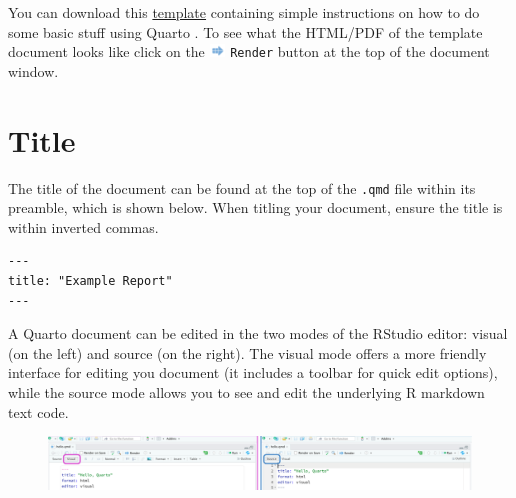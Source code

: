 \documentclass[
  letterpaper,
  DIV=11,
  numbers=noendperiod]{scrartcl}
\begin{document}
\begin{tcolorbox}[enhanced jigsaw, colback=white, toprule=.15mm, arc=.35mm, colbacktitle=quarto-callout-note-color!10!white, titlerule=0mm, colframe=quarto-callout-note-color-frame, title=\textcolor{quarto-callout-note-color}{\faInfo}\hspace{0.5em}{Note}, bottomtitle=1mm, toptitle=1mm, coltitle=black, rightrule=.15mm, opacityback=0, bottomrule=.15mm, breakable, leftrule=.75mm, left=2mm, opacitybacktitle=0.6]

You can download this
\href{https://quarto.org/docs/get-started/hello/rstudio/_hello.qmd}{template}
containing simple instructions on how to do some basic stuff using
Quarto . To see what the HTML/PDF of the template document looks like
click on the
\includegraphics[width=0.16667in,height=0.13542in]{images/rstudio-render-button.png}
\texttt{Render} button at the top of the document window.

\end{tcolorbox}

\hypertarget{title}{%
\section{Title}\label{title}}

The title of the document can be found at the top of the \texttt{.qmd}
file within its preamble, which is shown below. When titling your
document, ensure the title is within inverted commas.

\begin{verbatim}
---
title: "Example Report"
---
\end{verbatim}

A Quarto document can be edited in the two modes of the RStudio editor:
visual (on the left) and source (on the right). The visual mode offers a
more friendly interface for editing you document (it includes a toolbar
for quick edit options), while the source mode allows you to see and
edit the underlying R markdown text code.

\begin{figure}

{\centering \includegraphics[width=7.94792in,height=\textheight]{images/quarto2.png}

}

\end{figure}
\end{document}
